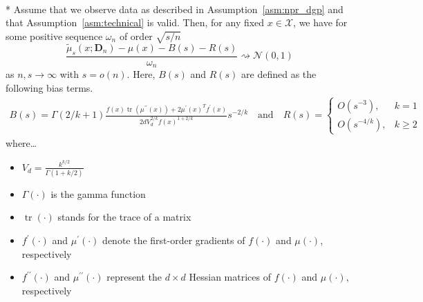 \begin{boxD}
	\begin{thm}\label{thm:dem2}\mbox{}\\*
		Assume that we observe data as described in Assumption~\ref{asm:npr_dgp} and that Assumption~\ref{asm:technical} is valid.
		Then, for any fixed $x \in \mathcal{X}$, we have for some positive sequence $\omega_n$ of order $\sqrt{s/n}$
		\begin{equation}
			\frac{\tilde{\mu}_{s}(x; \mathbf{D}_n) - \mu(x) - B(s) - R(s)}{\omega_n}
			\rightsquigarrow \mathcal{N}\left(0,1\right)
		\end{equation}
		as $n,s \rightarrow \infty$ with $s = o(n)$.
		Here, $B(s)$ and $R(s)$ are defined as the following bias terms.
		\begin{align}
			B(s)
			= \Gamma(2 / k+1) \frac{f(x) \operatorname{tr}\left(\mu^{\prime \prime}(x)\right)+2 \mu^{\prime}(x)^T f^{\prime}(x)}{2 d V_d^{2 / k} f(x)^{1+2 / k}} s^{-2 / k}
			\quad \text{and} \quad
			R(s) =
			\begin{cases}
				O\left(s^{-3}\right),     & k = 1      \\
				O\left(s^{-4 / k}\right), & k \geq 2
			\end{cases}
		\end{align}
		where\dots
		\begin{multicols}{2}
			\begin{itemize}
				\item $V_d=\frac{k^{k / 2}}{\Gamma(1+k / 2)}$
				\item $\Gamma(\cdot)$ is the gamma function
				\item $\operatorname{tr}(\cdot)$ stands for the trace of a matrix
				\item $f^{\prime}(\cdot)$ and $\mu^{\prime}(\cdot)$ denote the first-order gradients of $f(\cdot)$ and $\mu(\cdot)$, respectively
				\item $f^{\prime \prime}(\cdot)$ and $\mu^{\prime \prime}(\cdot)$ represent the $d \times d$ Hessian matrices of $f(\cdot)$ and $\mu(\cdot)$, respectively
			\end{itemize}
		\end{multicols}
	\end{thm}
\end{boxD}

